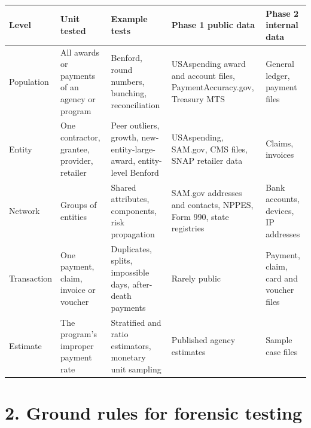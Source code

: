 \documentclass[letterpaper,11pt]{article}
\begin{document}
\begingroup\small\setlength{\tabcolsep}{4pt}\renewcommand{\arraystretch}{1.25}
\begin{longtable}[l]{@{}>{\raggedright\arraybackslash}p{}>{\raggedright\arraybackslash}p{}>{\raggedright\arraybackslash}p{}>{\raggedright\arraybackslash}p{}>{\raggedright\arraybackslash}p{}@{}}
\rowcolor{coolblack}\leavevmode\color{white}\bfseries Level & \leavevmode\color{white}\bfseries Unit tested & \leavevmode\color{white}\bfseries Example tests & \leavevmode\color{white}\bfseries Phase 1 public data & \leavevmode\color{white}\bfseries Phase 2 internal data \\
\endhead
Population & All awards or payments of an agency or program & Benford, round numbers, bunching, reconciliation & USAspending award and account files, PaymentAccuracy.gov, Treasury MTS & General ledger, payment files \\
Entity & One contractor, grantee, provider, retailer & Peer outliers, growth, new-entity-large-award, entity-level Benford & USAspending, SAM.gov, CMS files, SNAP retailer data & Claims, invoices \\
Network & Groups of entities & Shared attributes, components, risk propagation & SAM.gov addresses and contacts, NPPES, Form 990, state registries & Bank accounts, devices, IP addresses \\
Transaction & One payment, claim, invoice or voucher & Duplicates, splits, impossible days, after-death payments & Rarely public & Payment, claim, card and voucher files \\
Estimate & The program's improper payment rate & Stratified and ratio estimators, monetary unit sampling & Published agency estimates & Sample case files \\
\end{longtable}\endgroup

\hypertarget{ground-rules-for-forensic-testing}{%
\section*{2. Ground rules for forensic
testing}\label{ground-rules-for-forensic-testing}}
\end{document}
